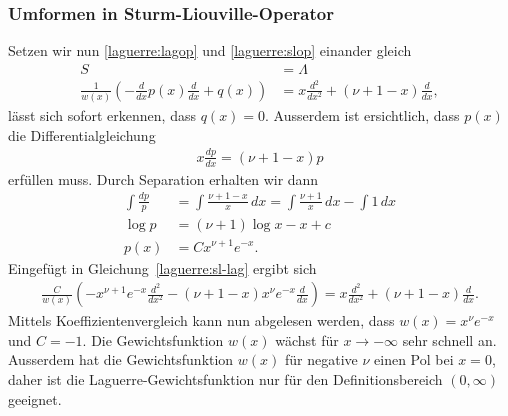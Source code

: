 
\subsubsection{Umformen in Sturm-Liouville-Operator}
%
Setzen wir nun 
\eqref{laguerre:lagop} und \eqref{laguerre:slop}
einander gleich
\begin{align}
S
 & =
\Lambda
\nonumber
\\
\frac{1}{w(x)} \left(-\frac{d}{dx}p(x) \frac{d}{dx} + q(x) \right)
 & =
x \frac{d^2}{dx^2} + (\nu + 1 - x) \frac{d}{dx}
\label{laguerre:sl-lag}
,
\end{align}
lässt sich sofort erkennen, dass $q(x) = 0$.
Ausserdem ist ersichtlich, dass $p(x)$ die Differentialgleichung
\begin{align*}
x \frac{dp}{dx}
=
(\nu + 1 - x) p
\end{align*}
erfüllen muss.
Durch Separation erhalten wir dann
\begin{align*}
\int \frac{dp}{p}
 & =
\int \frac{\nu + 1 - x}{x} \, dx
=
\int \frac{\nu + 1}{x} \, dx - \int 1\, dx
\\
\log p
 & =
(\nu + 1)\log x - x + c
\\
p(x)
 & =
C x^{\nu + 1} e^{-x}
.
\end{align*}
Eingefügt in Gleichung~\eqref{laguerre:sl-lag} ergibt sich
\begin{align*}
\frac{C}{w(x)}
\left(
-x^{\nu+1} e^{-x} \frac{d^2}{dx^2} -
(\nu + 1 - x) x^{\nu} e^{-x} \frac{d}{dx}
\right)
=
x \frac{d^2}{dx^2} + (\nu + 1 - x) \frac{d}{dx}.
\end{align*}
Mittels Koeffizientenvergleich kann nun abgelesen werden,
dass $w(x) = x^\nu e^{-x}$ und $C=-1$. %
Die Gewichtsfunktion $w(x)$ wächst für $x\rightarrow-\infty$ sehr schnell an.
%
Ausserdem hat die Gewichtsfunktion $w(x)$ für negative $\nu$ einen Pol bei $x=0$,
daher ist die Laguerre-Gewichtsfunktion nur für den
%
Definitionsbereich $(0, \infty)$ geeignet.

